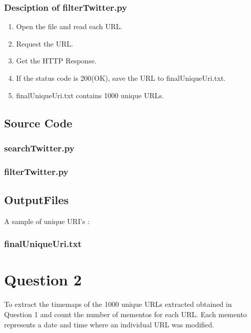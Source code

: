 \documentclass[12pt]{article}
\begin{document}
\subsubsection{Desciption of filterTwitter.py}
\begin{enumerate}
	\item Open the file and read each URL.
	\item Request the URL.
	\item Get the HTTP Response.
	\item If the status code is 200(OK), save the URL to finalUniqueUri.txt.
	\item finalUniqueUri.txt contains 1000 unique URLs.
\end{enumerate}

\newpage
\subsection{Source Code}
\subsubsection{searchTwitter.py}

\subsubsection{filterTwitter.py}

\newpage
\subsection{OutputFiles}
A sample of unique URI's :
\subsubsection{finalUniqueUri.txt}


\newpage
\section{Question 2}

To extract the timemaps of the 1000 unique URLs extracted obtained in Question 1 and count the number of mementos for each URL. Each memento represents a date and time where an individual URL was modified.
\end{document}

